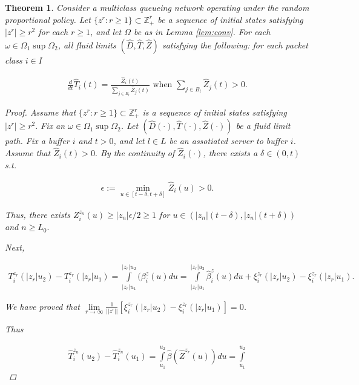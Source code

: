 \documentclass[11pt]{article}
\newcommand{\Z}{\mathbb{Z}}
\newtheorem{theorem}{Theorem}
\theoremstyle{definition}
\numberwithin{equation}{section}
\begin{document}
\begin{theorem}
Consider a multiclass queueing network operating under the random proportional policy. Let $\{z^r:r\geq 1\}\subset \Z^r_+$ be a sequence of initial states satisfying $|z^r|\geq r^2$ for each $r\geq 1$, and let $\Omega$ be as in Lemma \ref{lem:conv}. For each $\omega\in \Omega_1 \sup \Omega_2$, all fluid limits $(\hat D, \hat T, \hat Z)$ satisfying the following: for each packet class $i\in I$

\begin{align}
\frac{d}{dt}\hat T_i(t) = \frac{\hat Z_i(t)}{\sum\limits_{j\in B_l} \hat Z_j(t)}\text{ when }
\sum\limits_{j\in B_l} \hat Z_j(t)>0.
\end{align}



\begin{proof}

Assume that $\{z^r:r\geq 1\}\subset \Z_+^r$ is a sequence of initial states satisfying $|z^r|\geq r^2.$ Fix an $\omega \in \Omega_1\sup \Omega_2$. Let $(\hat D(\cdot), \hat T(\cdot), \hat Z(\cdot))$ be a fluid limit path. Fix a buffer $i$ and $t>0$, and let $l\in L$ be an assotiated server to buffer $i$. Assume that $\hat Z_i(t)>0.$ By the continuity of $\hat Z_i(\cdot)$, there exists a $\delta\in (0, t)$ s.t. 

\begin{align}
\epsilon:=\min\limits_{u\in [t-\delta, t+\delta]}\hat Z_i(u)>0. 
\end{align}

Thus, there exists $Z_i^{z_n}(u)\geq |z_n|\epsilon/2\geq 1$ for $u\in (|z_n|(t-\delta), |z_n|(t+\delta))$ and $n\geq L_0.$

Next,


\begin{align}
T_i^{z_r}(|z_r|u_2) - T_i^{z_r}(|z_r|u_1) = \int \limits_{|z_r|u_1}^{|z_r|u_2} ( \beta_i^z(u) du= \int \limits_{|z_r|u_1}^{|z_r|u_2}  \hat \beta_i^z(u) du+ \xi_i^{z_r} (|z_r|u_2) -  \xi_i^{z_r}(|z_r|u_1).
\end{align}



We have proved that $\lim\limits_{r\rightarrow \infty} \frac{1}{||z^r||}\left[ \xi_i^{z_r} (|z_r|u_2) -  \xi_i^{z_r}(|z_r|u_1) \right]= 0$.


Thus 

\begin{align}
\hat T_i^{z_n}(u_2) - \hat T_i^{z_n}(u_1) = \int\limits_{u_1}^{u_2} \hat \beta (\hat Z^{z_r}(u))du = \int\limits_{u_1}^{u_2}
\end{align}
\end{proof}
\end{theorem}
\end{document}
